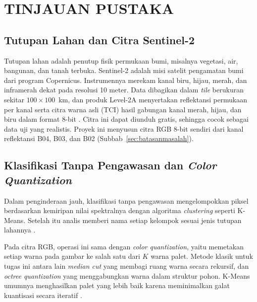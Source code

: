 \chapter{TINJAUAN PUSTAKA}

\section{Tutupan Lahan dan Citra Sentinel-2}
Tutupan lahan adalah penutup fisik permukaan bumi, misalnya vegetasi, air, bangunan, dan tanah terbuka. Sentinel-2 adalah misi satelit pengamatan bumi dari program Copernicus. Instrumennya merekam kanal biru, hijau, merah, dan inframerah dekat pada resolusi 10 meter. Data dibagikan dalam \emph{tile} berukuran sekitar $100\times100$~km, dan produk Level-2A menyertakan reflektansi permukaan per kanal serta citra warna asli (TCI) hasil gabungan kanal merah, hijau, dan biru dalam format 8-bit \cite{esa2015}. Citra ini dapat diunduh gratis, sehingga cocok sebagai data uji yang realistis. Proyek ini menyusun citra RGB 8-bit sendiri dari kanal reflektansi B04, B03, dan B02 (Subbab~\ref{sec:batasanmasalah}).

\section{Klasifikasi Tanpa Pengawasan dan \emph{Color Quantization}}
Dalam penginderaan jauh, klasifikasi tanpa pengawasan mengelompokkan piksel berdasarkan kemiripan nilai spektralnya dengan algoritma \emph{clustering} seperti K-Means. Setelah itu analis memberi nama setiap kelompok sesuai jenis tutupan lahannya \cite{richards2022}.

Pada citra RGB, operasi ini sama dengan \emph{color quantization}, yaitu memetakan setiap warna pada gambar ke salah satu dari $K$ warna palet. Metode klasik untuk tugas ini antara lain \emph{median cut} \cite{heckbert1982} yang membagi ruang warna secara rekursif, dan \emph{octree quantization} \cite{gervautz1988} yang menggabungkan warna dalam struktur pohon. K-Means umumnya menghasilkan palet yang lebih baik karena meminimalkan galat kuantisasi secara iteratif \cite{celebi2011}.

